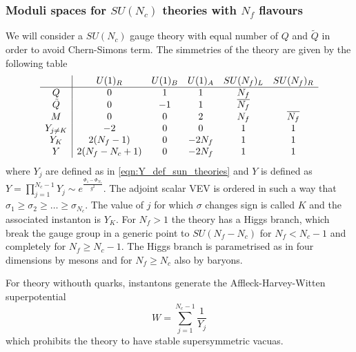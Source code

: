 \subsubsection{Moduli spaces for $SU(N_c)$ theories with $N_f$ flavours}
We will consider a $SU(N_c)$ gauge theory with equal number of $Q$ and $\tilde{Q}$ in order to avoid Chern-Simons term. 
The simmetries of the theory are given by the following table
\begin{equation}
\begin{array}{ c | c c c c c}
  & U(1)_R & U(1)_B & U(1)_A & SU(N_f)_L & SU(N_f)_R \\
 \hline
 Q & 0 &1 & 1 & N_f \\  
 \tilde{Q}& 0 &-1 & 1 & \overline{N_f} \\  
   M & 0 & 0 & 2 & N_f  & \overline{N_f}\\  
   Y_{j \neq K} & -2 & 0  & 0 &  1 & 1 \\
   Y_{K} & 2 (N_f -1 ) & 0 & - 2 N_f & 1 & 1 \\
   Y & 2 ( N_f -N_c +1) & 0 & - 2 N_f & 1 & 1 \\
\end{array}
\end{equation}
where $Y_j$ are defined as in \eqref{eqn:Y_def_sun_theories} and $Y$ is defined as $Y = \prod_{j=1}^{N_c -1} Y_j \sim e^{ \frac{ \Phi_1 - \Phi_{N_c}  }{g^2}}$.
The adjoint scalar VEV is ordered in such a way that $ \sigma_1 \geq \sigma_2 \geq \dotsc \geq \sigma_{N_c}$. The value of $j$ for which $\sigma$ changes sign is called $K$ and the associated instanton is $Y_K$.
For $N_f > 1$ the theory has a Higgs branch, which break the gauge group in a generic point to $SU(N_f -N_c)$ for $N_f <N_c -1 $ and completely for $N_f \geq N_c - 1$. 
The Higgs branch is parametrised as in four dimensions by mesons and for $N_f \geq N_c$ also by baryons.

For theory withouth quarks, instantons generate the Affleck-Harvey-Witten \cite{Affleck:1982as} superpotential
\begin{equation}
W = \sum_{j=1}^{N_c - 1} \frac{1}{Y_j}
\end{equation}
which prohibits the theory to have stable supersymmetric vacuas.

